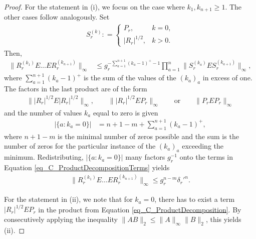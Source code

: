 \documentclass[a4paper,11pt]{article} %
\numberwithin{equation}{section}
\theoremstyle{definition}
\theoremstyle{remark}
\theoremstyle{plain}
\begin{document}
\begin{proof}%
  For the statement in (i), we focus on the case where \( k_{1}, k_{ n + 1 } \ge 1 \). 
  The other cases follow analogously.
  Set
  \begin{align}
    S_{r}^{ (k) }: = \begin{cases} 
                       P_{r},           & k = 0, \\
                       | R_{r} |^{1/2}, & k > 0.
                     \end{cases}
  \end{align}
  Then,
  \begin{align}
    \label{eq_C_ProductDecomposition}
          \| R_{r}^{ (k_{1}) } E \dots E R_{r}^{ (k_{ n + 1 }) } \|_{\infty} 
    & \le 
          g_{r}^{-\sum_{a = 1}^{n + 1} (k_{a} - 1)^{+} - 1} 
          \prod_{ a = 1 }^{n}
          \| S_{r}^{ (k_{a}) } E S_{r}^{ (k_{a + 1}) } \|_{\infty},
  \end{align}
  where \( \sum_{a = 1}^{n + 1} (k_{a} - 1)^{+} \) is the sum of the values of
  the \( ( k_{a} )_{a} \) in excess of one.
  The factors in the last product are of the form
  \begin{align}
    \label{eq_C_ProductDecompositionTerms}
    \| | R_{r} |^{1/2} E | R_{r} |^{1/2} \|_{\infty}, \qquad 
    \| | R_{r} |^{1/2} E P_{r}           \|_{\infty} \qquad \text{or} \qquad 
    \| P_{r}           E P_{r}           \|_{\infty}
  \end{align}
  and the number of values \( k_{a} \) equal to zero is given
  \begin{align}
    | \{ a: k_{a} = 0 \} | & = n + 1 - m 
                             + \sum_{a = 1}^{n + 1} (k_{a} - 1)^{+}, 
  \end{align}
  where \( n + 1 - m \) is the minimal number of zeros possible and the sum is
  the number of zeros for the particular instance of the \( ( k_{a} )_{a} \)
  exceeding the minimum.
  Redistributing, \( | \{ a: k_{a} = 0 \} | \) many factors \( g_{r}^{-1} \)
  onto the terms in Equation \eqref{eq_C_ProductDecompositionTerms} yields
  \begin{align}
        \| R_{r}^{ ( k_{1} ) } E \dots E R_{r}^{ ( k_{n + 1} ) } \|_{\infty} 
    \le 
        g_{r}^{n - m} \delta_{r}'^{n}.
  \end{align}

  For the statement in (ii), we note that for \( k_{a} = 0 \), there has to
  exist a term \( | R_{r} |^{1/2} E P_{r} \) in the product from Equation
  \eqref{eq_C_ProductDecomposition}.
  By consecutively applying the inequality 
  \( \| A B \|_{2} \le \| A \| _{\infty} \| B \|_{2} \), this yields (ii).
\end{proof}%
\end{document}
